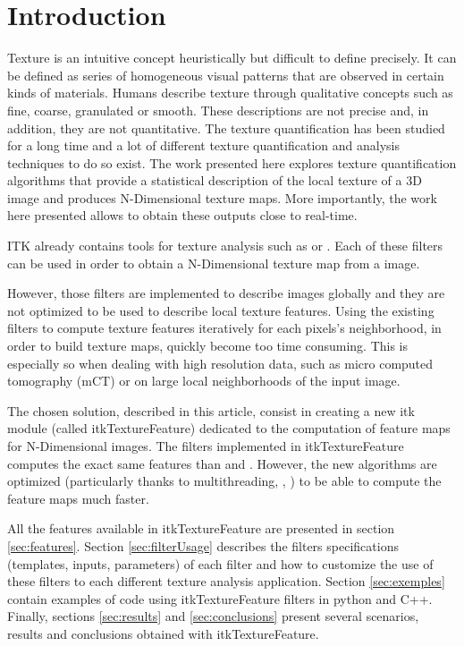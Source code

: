 \documentclass{InsightArticle}
\newcommand{\IJhandlerIDnumber}{1338}
\begin{document}
\IJhandlenote{\IJhandlerIDnumber}
\newpage
\tableofcontents
\newpage
\section{Introduction}
\label{sec:intro}

Texture is an intuitive concept heuristically but difficult to define precisely. It can be defined as series of homogeneous visual patterns that are observed in certain kinds of materials. Humans describe texture through qualitative concepts such as fine, coarse, granulated or smooth. These descriptions are not precise and, in addition, they are not quantitative. The texture quantification has been studied for a long time and a lot of different texture quantification and analysis techniques to do so exist. The work presented here explores texture quantification algorithms that provide a statistical description of the local texture of a 3D image and produces N-Dimensional texture maps. More importantly, the work here presented allows to obtain these outputs close to real-time. 

ITK already contains tools for texture analysis such as  or . Each of these filters can be used in order to obtain a N-Dimensional texture map from a image.

However, those filters are implemented to describe images globally and they are not optimized to be used to describe local texture features. Using the existing filters to compute texture features iteratively for each pixels's neighborhood, in order to build texture maps, quickly become too time consuming. This is especially so when dealing with high resolution data, such as micro computed tomography (mCT) or on large local neighborhoods of the input image.

The chosen solution, described in this article, consist in creating a new itk module (called itkTextureFeature) dedicated to the computation of feature maps for N-Dimensional images. The filters implemented in itkTextureFeature computes the exact same features than  and . However, the new algorithms are optimized (particularly thanks to multithreading, , ) to be able to compute the feature maps much faster.

All the features available in itkTextureFeature are presented in section \ref{sec:features}. Section \ref{sec:filterUsage} describes the filters specifications (templates, inputs, parameters) of each filter and how to customize the use of these filters to each different texture analysis application. Section \ref{sec:exemples} contain examples of code using itkTextureFeature filters in python and C++. Finally, sections \ref{sec:results} and \ref{sec:conclusions} present several scenarios, results and conclusions obtained with itkTextureFeature. 
\newpage
\end{document}
